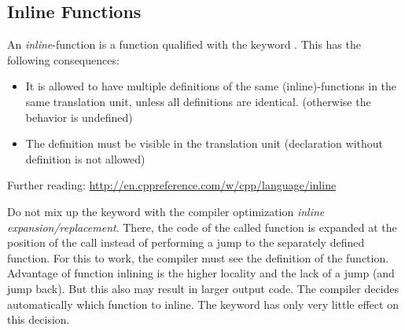 \subsection{Inline Functions\label{sec:inline-function}}
An \emph{inline}-function is a function qualified with the keyword . This has the following consequences:
\begin{itemize}
  \item It is allowed to have multiple definitions of the same (inline)-functions in the same translation unit, unless all definitions are identical.
        (otherwise the behavior is undefined)
  \item The definition must be visible in the translation unit (declaration without definition is not allowed)
\end{itemize}
Further reading: \url{http://en.cppreference.com/w/cpp/language/inline}

Do not mix up the keyword  with the compiler optimization \emph{inline expansion/replacement}. There, the code of the called function is
expanded at the position of the call instead of performing a jump to the separately defined function. For this to work, the compiler must see the
definition of the function. Advantage of function inlining is the higher locality and the lack of a jump (and jump back). But this also may result in
larger output code. The compiler decides automatically which function to inline. The keyword  has only very little effect on this decision.
